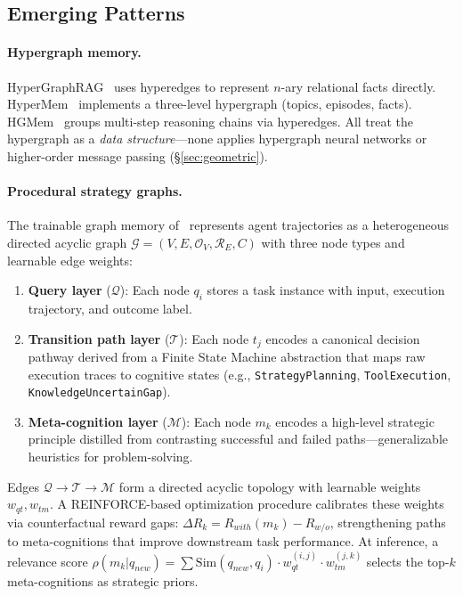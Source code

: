\documentclass[hf]{ceurart}
\begin{document}
\subsection{Emerging Patterns}

\paragraph{Hypergraph memory.}
HyperGraphRAG~\cite{hypergraphrag2025} uses hyperedges to represent
$n$-ary relational facts directly.
HyperMem~\cite{hypermem2026} implements a three-level hypergraph
(topics, episodes, facts). HGMem~\cite{hgmem2025} groups multi-step
reasoning chains via hyperedges. All treat the hypergraph as a
\emph{data structure}---none applies hypergraph neural networks or
higher-order message passing (\S\ref{sec:geometric}).

\paragraph{Procedural strategy graphs.}
The trainable graph memory of~\cite{trainablegraph2025} represents
agent trajectories as a heterogeneous directed acyclic graph
$\mathcal{G} = (V, E, \mathcal{O}_V, \mathcal{R}_E, C)$
with three node types and learnable edge weights:
\begin{enumerate}
\item \textbf{Query layer} ($\mathcal{Q}$): Each node $q_i$ stores a
  task instance with input, execution trajectory, and outcome label.
\item \textbf{Transition path layer} ($\mathcal{T}$): Each node $t_j$
  encodes a canonical decision pathway derived from a Finite State
  Machine abstraction that maps raw execution traces to cognitive
  states (e.g., \texttt{StrategyPlanning}, \texttt{ToolExecution},
  \texttt{KnowledgeUncertainGap}).
\item \textbf{Meta-cognition layer} ($\mathcal{M}$): Each node $m_k$
  encodes a high-level strategic principle distilled from contrasting
  successful and failed paths---generalizable heuristics for
  problem-solving.
\end{enumerate}
Edges $\mathcal{Q} \to \mathcal{T} \to \mathcal{M}$ form a directed
acyclic topology with learnable weights $w_{qt}, w_{tm}$.
A REINFORCE-based optimization procedure calibrates these weights via
counterfactual reward gaps: $\Delta R_k = R_{with}(m_k) - R_{w/o}$,
strengthening paths to meta-cognitions that improve downstream task
performance. At inference, a relevance score
$\rho(m_k | q_{new}) = \sum \text{Sim}(q_{new}, q_i) \cdot
w_{qt}^{(i,j)} \cdot w_{tm}^{(j,k)}$ selects the top-$k$
meta-cognitions as strategic priors.
\end{document}
